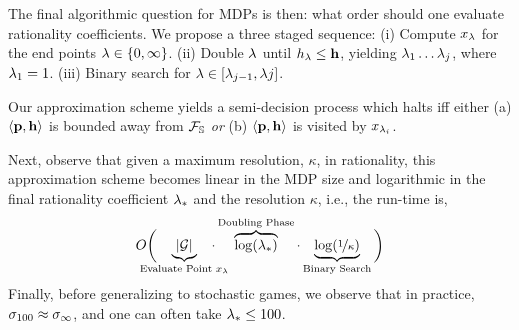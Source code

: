  The final algorithmic question for
MDPs is then: what order should one evaluate rationality coefficients.
We propose a three staged sequence: (i) Compute $x_\lambda$ for the end
points $\lambda \in \{0, \infty\}$.  (ii) Double $\lambda$ until $h_\lambda \leq
\mathbf{h}$, yielding $\lambda_1\ldots \lambda_j$, where $\lambda_1 = 1$.
(iii) Binary search for $\lambda \in [\lambda_{j-1}, \lambda{j}]$.
\begin{mdframed}
  Our approximation scheme yields a semi-decision process which halts
  iff either (a) $\langle \mathbf{p}, \mathbf{h} \rangle$ is
  bounded away from $\mathcal{F}_{\mathbb{S}}$ \emph{or} (b)
  $\langle \mathbf{p}, \mathbf{h} \rangle$ is visited by
  $x_{\lambda_i}$.
\end{mdframed}
Next, observe that given a maximum resolution, $\kappa$, in
rationality, this approximation scheme becomes linear in the MDP size
and logarithmic in the final rationality coefficient $\lambda_*$ and the
resolution $\kappa$, i.e., the run-time is,
\begin{equation}
  O\bigg(\hspace{-1.4em}\underbrace{|\sg|}_{\text{Evaluate Point $x_\rat$}}\hspace{-1.4em}\cdot\overbrace{\log(\rat_*)}^{\text{Doubling Phase}}\cdot\underbrace{\log(\nicefrac{1}{\kappa})}_{\text{Binary Search}}\bigg)
\end{equation}
Finally, before generalizing to stochastic games, we observe that in
practice, $\sigma_{100} \approx \sigma_\infty$, and one can often take
$\lambda_* \leq 100$.

